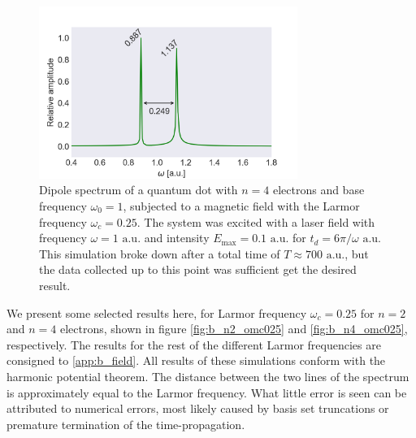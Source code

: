 \begin{figure}
    \centering    
    \includegraphics[width=0.75\textwidth]
        {results/figures/B_field/n=4/b_spectrum_n=4_omc=025.png}
    \caption{Dipole spectrum of a quantum dot with $n=4$ electrons and base frequency 
        $\omega_0 = 1$,
        subjected to a magnetic field with the Larmor frequency $\omega_c=0.25$. The 
        system was excited with a laser field with frequency $\omega = 1 \text{ a.u.}$ 
        and intensity $E_\text{max} = 0.1 \text{ a.u.}$ for $t_d = 6\pi/\omega \text{ a.u.}$
        This simulation broke down after a total time of $T\approx700 \text{ a.u.}$,
        but the data collected up to this point was sufficient get the desired result.
        }
    \label{fig:b_n4_omc025}
\end{figure}

We present some selected results here, for Larmor frequency $\omega_c=0.25$ for 
$n=2$ and $n=4$ electrons, shown in figure \autoref{fig:b_n2_omc025}
and \autoref{fig:b_n4_omc025}, respectively.
The results for 
the rest of the different Larmor frequencies are consigned to \autoref{app:b_field}.
All results of these simulations conform with the harmonic potential theorem. The 
distance between the two lines of the spectrum is approximately equal to the 
Larmor frequency. What little error is seen can be attributed to numerical errors,
most likely caused by basis set truncations or premature termination of the
time-propagation.

\clearemptydoublepage
